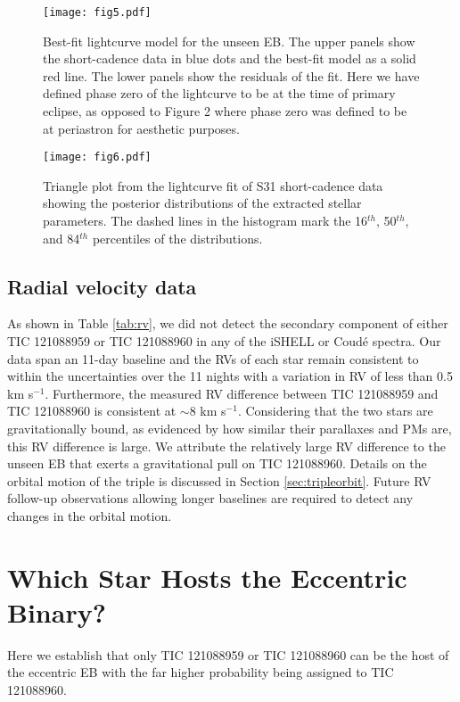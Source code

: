 \documentclass[fleqn,usenatbib]{mnras} %
\newcommand{\kms}{km s$^{-1}$}
\begin{document}
\begin{figure*}
\texttt{[image: fig5.pdf]}
\caption{Best-fit lightcurve model for the unseen EB. The upper panels show the short-cadence data in blue dots and the best-fit model as a solid red line. The lower panels show the residuals of the fit. Here we have defined phase zero of the lightcurve to be at the time of primary eclipse, as opposed to Figure 2 where phase zero was defined to be at periastron for aesthetic purposes.}
\label{fig:bestfit}
\end{figure*}

\begin{figure*}
\texttt{[image: fig6.pdf]}
\caption{Triangle plot from the lightcurve fit of S31 short-cadence data showing the posterior distributions of the extracted stellar parameters. The dashed lines in the histogram mark the 16$^{th}$, 50$^{th}$, and 84$^{th}$ percentiles of the distributions. }
\label{fig:corner}
\end{figure*}

\subsection{Radial velocity data}

As shown in Table \ref{tab:rv}, we did not detect the secondary component of either TIC 121088959 or TIC 121088960 in any of the iSHELL or Coud\'e spectra. Our data span an 11-day baseline and the RVs of each star remain consistent to within the uncertainties over the 11 nights with a variation in RV of less than 0.5 \kms. Furthermore, the measured RV difference between TIC 121088959 and TIC 121088960 is consistent at $\sim$8 \kms. Considering that the two stars are gravitationally bound, as evidenced by how similar their parallaxes and PMs are, this RV difference is large. We attribute the relatively large RV difference to the unseen EB that exerts a gravitational pull on TIC 121088960. Details on the orbital motion of the triple is discussed in Section \ref{sec:tripleorbit}. Future RV follow-up observations allowing longer baselines are required to detect any changes in the orbital motion.

\section{Which Star Hosts the Eccentric Binary?}
\label{sec:host}
Here we establish that only TIC 121088959 or TIC 121088960 can be the host of the eccentric EB with the far higher probability being assigned to TIC 121088960.
\end{document}
